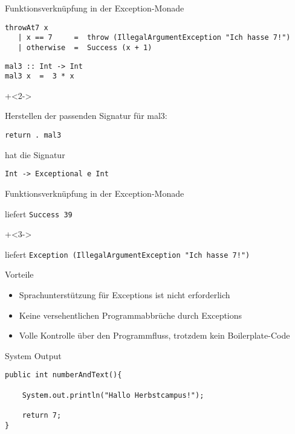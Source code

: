 \begin{frame}[fragile]{Funktionsverknüpfung in der Exception-Monade}
\begin{lstlisting}
throwAt7 x
   | x == 7     =  throw (IllegalArgumentException "Ich hasse 7!")
   | otherwise  =  Success (x + 1)
\end{lstlisting}

\begin{lstlisting}
mal3 :: Int -> Int
mal3 x  =  3 * x
\end{lstlisting}

\onslide+<2->

Herstellen der passenden Signatur für mal3:

\begin{lstlisting}
return . mal3
\end{lstlisting}

hat die Signatur

\begin{lstlisting}
Int -> Exceptional e Int
\end{lstlisting}

\end{frame}


\begin{frame}[fragile]{Funktionsverknüpfung in der Exception-Monade}


liefert \lstinline|Success 39|

\onslide+<3->


liefert \lstinline|Exception (IllegalArgumentException "Ich hasse 7!")|



\end{frame}

\begin{frame}[fragile]{Vorteile}

\begin{itemize}
\item Sprachunterstützung für Exceptions ist nicht erforderlich
\item Keine versehentlichen Programmabbrüche durch Exceptions
\item Volle Kontrolle über den Programmfluss, trotzdem kein Boilerplate-Code
\end{itemize}

\end{frame}


\begin{frame}[fragile]{System Output}

\begin{lstlisting}
public int numberAndText(){

    System.out.println("Hallo Herbstcampus!");
    
    return 7;
}
\end{lstlisting}

\end{frame}


